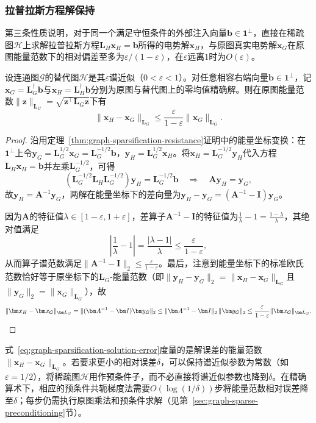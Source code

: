 \subsubsection{拉普拉斯方程解保持}
\label{sec:graph-sparsification-solution-preservation}

第三条性质说明，对于同一个满足守恒条件的外部注入向量$\bm b\in\bm 1^\perp$，直接在稀疏图$\mathcal H$上求解拉普拉斯方程$\bm L_H\bm x_H=\bm b$所得的电势解$\bm x_H$，与原图真实电势解$\bm x_G$在原图能量范数下的相对偏差至多为$\varepsilon/(1-\varepsilon)$，在$\varepsilon$远离$1$时为$O(\varepsilon)$。

\begin{theorem}[谱近似保持拉普拉斯方程解]
\label{thm:graph-sparsification-solution}
设连通图$\mathcal G$的替代图$\mathcal H$是其$\varepsilon$谱近似（$0<\varepsilon<1$）。对任意相容右端向量$\bm b\in\bm 1^\perp$，记$\bm x_G=\bm L_G^\dagger\bm b$与$\bm x_H=\bm L_H^\dagger\bm b$分别为原图与替代图上的零均值精确解。则在原图能量范数$\lVert\bm z\rVert_{\bm L_G}=\sqrt{\bm z^\top\bm L_G\bm z}$下有
\begin{equation}
\lVert\bm x_H-\bm x_G\rVert_{\bm L_G}
\leq \frac{\varepsilon}{1-\varepsilon}
      \lVert\bm x_G\rVert_{\bm L_G}.
\label{eq:graph-sparsification-solution-error}
\end{equation}
\end{theorem}

\begin{proof}
沿用定理~\ref{thm:graph-sparsification-resistance}证明中的能量坐标变换：在$\bm 1^\perp$上令$\bm y_G=\bm L_G^{1/2}\bm x_G=\bm L_G^{-1/2}\bm b$，$\bm y_H=\bm L_G^{1/2}\bm x_H$。将$\bm x_H=\bm L_G^{-1/2}\bm y_H$代入方程$\bm L_H\bm x_H=\bm b$并左乘$\bm L_G^{-1/2}$，可得
\[
  (\bm L_G^{-1/2}\bm L_H\bm L_G^{-1/2})\bm y_H = \bm L_G^{-1/2}\bm b
  \quad\Longrightarrow\quad
  \bm A\bm y_H = \bm y_G,
\]
故$\bm y_H=\bm A^{-1}\bm y_G$，两解在能量坐标下的差向量为$\bm y_H-\bm y_G=(\bm A^{-1}-\bm I)\bm y_G$。

因为$\bm A$的特征值$\lambda\in[1-\varepsilon,1+\varepsilon]$，差算子$\bm A^{-1}-\bm I$的特征值为$\frac{1}{\lambda}-1=\frac{1-\lambda}{\lambda}$，其绝对值满足
\[
  \left|\frac{1}{\lambda}-1\right| = \frac{|\lambda-1|}{\lambda} \leq \frac{\varepsilon}{1-\varepsilon},
\]
从而算子谱范数满足$\lVert\bm A^{-1}-\bm I\rVert_2\leq\frac{\varepsilon}{1-\varepsilon}$。最后，注意到能量坐标下的标准欧氏范数恰好等于原坐标下的$\bm L_G$-能量范数（即$\lVert\bm y_H-\bm y_G\rVert_2=\lVert\bm x_H-\bm x_G\rVert_{\bm L_G}$且$\lVert\bm y_G\rVert_2=\lVert\bm x_G\rVert_{\bm L_G}$），故
\[
  \lVert\bm x_H-\bm x_G\rVert_{\bm L_G}
  =\lVert(\bm A^{-1}-\bm I)\bm y_G\rVert_2
  \leq\lVert\bm A^{-1}-\bm I\rVert_2\,\lVert\bm y_G\rVert_2
  \leq\frac{\varepsilon}{1-\varepsilon}\lVert\bm x_G\rVert_{\bm L_G}.\qedhere
\]
\end{proof}

式~\eqref{eq:graph-sparsification-solution-error}度量的是解误差的能量范数$\lVert\bm x_H-\bm x_G\rVert_{\bm L_G}$。若要求更小的相对误差$\delta$，可以保持谱近似参数为常数（如$\varepsilon=1/2$），将稀疏图$\mathcal H$用作预条件子，而不必直接将谱近似参数也降到$\delta$。在精确算术下，相应的预条件共轭梯度法需要$O(\log(1/\delta))$步将能量范数相对误差降至$\delta$；每步仍需执行原图乘法和预条件求解（见第~\ref{sec:graph-sparse-preconditioning}节）。
